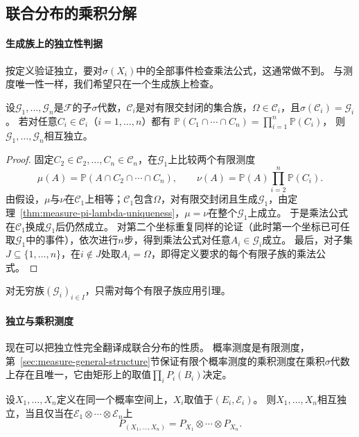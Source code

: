 \subsection{联合分布的乘积分解}

\paragraph{生成族上的独立性判据}
按定义验证独立，要对$\sigma(X_i)$中的全部事件检查乘法公式，这通常做不到。
与测度唯一性一样，我们希望只在一个生成族上检查。

\begin{lemma}[生成族上的独立性判据]
\label{lem:pmod-pi-independence}
设$\mathcal G_1,\dots,\mathcal G_n$是$\mathcal F$的子$\sigma$代数，$\mathcal C_i$是对有限交封闭的集合族，$\Omega\in\mathcal C_i$，且$\sigma(\mathcal C_i)=\mathcal G_i$。
若对任意$C_i\in\mathcal C_i$（$i=1,\dots,n$）都有
$\mathbb P(C_1\cap\cdots\cap C_n)=\prod_{i=1}^n\mathbb P(C_i)$，
则$\mathcal G_1,\dots,\mathcal G_n$相互独立。
\end{lemma}

\begin{proof}
固定$C_2\in\mathcal C_2,\dots,C_n\in\mathcal C_n$，在$\mathcal G_1$上比较两个有限测度
\[
  \mu(A)=\mathbb P(A\cap C_2\cap\cdots\cap C_n),\qquad
  \nu(A)=\mathbb P(A)\prod_{i=2}^n\mathbb P(C_i).
\]
由假设，$\mu$与$\nu$在$\mathcal C_1$上相等；$\mathcal C_1$包含$\Omega$，对有限交封闭且生成$\mathcal G_1$，由定理~\ref{thm:measure-pi-lambda-uniqueness}，$\mu=\nu$在整个$\mathcal G_1$上成立。
于是乘法公式在$\mathcal C_1$换成$\mathcal G_1$后仍然成立。
对第二个坐标重复同样的论证（此时第一个坐标已可任取$\mathcal G_1$中的事件），依次进行$n$步，得到乘法公式对任意$A_i\in\mathcal G_i$成立。
最后，对子集$J\subseteq\{1,\dots,n\}$，在$i\notin J$处取$A_i=\Omega$，即得定义要求的每个有限子族的乘法公式。
\end{proof}

对无穷族$(\mathcal G_i)_{i\in I}$，只需对每个有限子族应用引理。

\paragraph{独立与乘积测度}
现在可以把独立性完全翻译成联合分布的性质。
概率测度是有限测度，第~\ref{sec:measure-general-structure}节保证有限个概率测度的乘积测度在乘积$\sigma$代数上存在且唯一，它由矩形上的取值$\prod_iP_i(B_i)$决定。

\begin{theorem}[独立与乘积分解]
\label{thm:pmod-independence-product}
设$X_1,\dots,X_n$定义在同一个概率空间上，$X_i$取值于$(E_i,\mathcal E_i)$。
则$X_1,\dots,X_n$相互独立，当且仅当在$\mathcal E_1\otimes\cdots\otimes\mathcal E_n$上
\[
  P_{(X_1,\dots,X_n)}=P_{X_1}\otimes\cdots\otimes P_{X_n}.
\]
\end{theorem}

